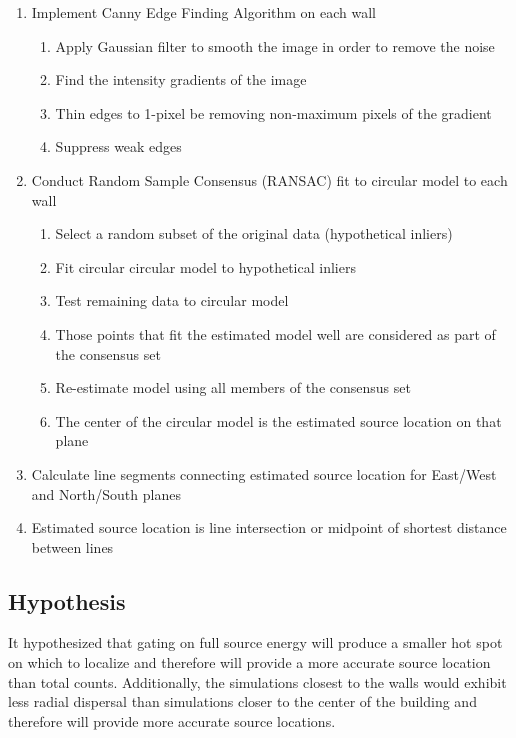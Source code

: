\begin{enumerate}
	\item Implement Canny Edge Finding Algorithm on each wall\cite{canny}
  \begin{enumerate}
  	\item Apply Gaussian filter to smooth the image in order to remove the noise
  	\item Find the intensity gradients of the image
  	\item Thin edges to 1-pixel be removing non-maximum pixels of the gradient
    \item Suppress weak edges
  \end{enumerate}
	\item Conduct Random Sample Consensus (RANSAC) fit to circular model to each wall\cite{ransac}
  \begin{enumerate}
  	\item Select a random subset of the original data (hypothetical inliers)
  	\item Fit circular circular model to hypothetical inliers
  	\item Test remaining data to circular model
    \item Those points that fit the estimated model well are considered as part of the consensus set
    \item Re-estimate model using all members of the consensus set
    \item The center of the circular model is the estimated source location on that plane
  \end{enumerate}
  \item Calculate line segments connecting estimated source location for East/West and North/South planes
  \item Estimated source location is line intersection or midpoint of shortest distance between lines
\end{enumerate}

\subsection{Hypothesis}
\noindent
It hypothesized that gating on full source energy will produce a smaller hot spot on which to localize and therefore will provide a more accurate source location than total counts. Additionally, the simulations closest to the walls would exhibit less radial dispersal than simulations closer to the center of the building and therefore will provide more accurate source locations.
